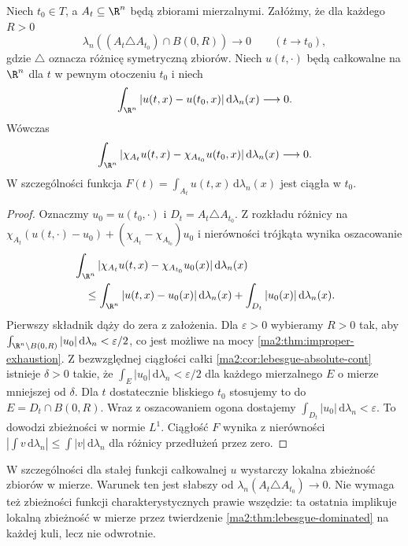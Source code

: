 \begin{twierdzenie}
\label{ma2:thm:parameter-moving-domains-measure}
Niech $t_0\in T$, a $A_t\subseteq\R^n$ będą
zbiorami mierzalnymi. Załóżmy, że dla każdego $R>0$
\[
 \lambda_n((A_t\triangle A_{t_0})\cap B(0,R))
 \longrightarrow0\qquad(t\to t_0),
\]
gdzie $\triangle$ oznacza różnicę symetryczną zbiorów.
Niech $u(t,\cdot)$ będą całkowalne na $\R^n$
dla $t$ w pewnym otoczeniu $t_0$ i niech
\[
 \int_{\R^n}|u(t,x)-u(t_0,x)|\,\mathrm d\lambda_n(x)
 \longrightarrow0.
\]
Wówczas
\[
 \int_{\R^n}|\chi_{A_t}u(t,x)-\chi_{A_{t_0}}u(t_0,x)|
 \,\mathrm d\lambda_n(x)\longrightarrow0.
\]
W szczególności funkcja
$F(t)=\int_{A_t}u(t,x)\,\mathrm d\lambda_n(x)$
jest ciągła w $t_0$.
\end{twierdzenie}
\begin{proof}
Oznaczmy $u_0=u(t_0,\cdot)$ i
$D_t=A_t\triangle A_{t_0}$.
Z rozkładu różnicy na
$\chi_{A_t}(u(t,\cdot)-u_0)+(\chi_{A_t}-\chi_{A_{t_0}})u_0$
i nierówności trójkąta wynika oszacowanie
\[
 \begin{split}
 &\int_{\R^n}|\chi_{A_t}u(t,x)-\chi_{A_{t_0}}u_0(x)|
       \,\mathrm d\lambda_n(x)\\
 &\quad\le \int_{\R^n}|u(t,x)-u_0(x)|\,\mathrm d\lambda_n(x)
      +\int_{D_t}|u_0(x)|\,\mathrm d\lambda_n(x).
 \end{split}
\]
Pierwszy składnik dąży do zera z założenia.
Dla $\varepsilon>0$ wybieramy $R>0$ tak, aby
$\int_{\R^n\setminus B(0,R)}|u_0|\,\mathrm d\lambda_n
<\varepsilon/2$, co jest możliwe na mocy
\ref{ma2:thm:improper-exhaustion}.
Z bezwzględnej ciągłości całki
\ref{ma2:cor:lebesgue-absolute-cont}
istnieje $\delta>0$ takie, że
$\int_E|u_0|\,\mathrm d\lambda_n<\varepsilon/2$
dla każdego mierzalnego $E$ o mierze mniejszej od
$\delta$. Dla $t$ dostatecznie bliskiego $t_0$
stosujemy to do $E=D_t\cap B(0,R)$.
Wraz z oszacowaniem ogona dostajemy
$\int_{D_t}|u_0|\,\mathrm d\lambda_n<\varepsilon$.
To dowodzi zbieżności w normie $L^1$.
Ciągłość $F$ wynika z nierówności
$|\int v\,\mathrm d\lambda_n|\le\int|v|\,\mathrm d\lambda_n$
dla różnicy przedłużeń przez zero.
\end{proof}

W szczególności dla stałej funkcji całkowalnej $u$
wystarczy lokalna zbieżność zbiorów w mierze.
Warunek ten jest słabszy od
$\lambda_n(A_t\triangle A_{t_0})\to0$.
Nie wymaga też zbieżności funkcji charakterystycznych
prawie wszędzie: ta ostatnia implikuje lokalną
zbieżność w mierze przez twierdzenie
\ref{ma2:thm:lebesgue-dominated}
na każdej kuli, lecz nie odwrotnie.

